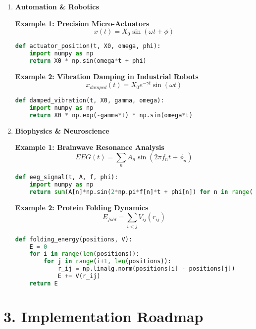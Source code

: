 \documentclass[12pt]{article}
\begin{document}
\begin{enumerate}[leftmargin=0pt, label=\textbf{\arabic*.}, itemsep=2em]
\item \textbf{Automation \& Robotics}

    \textbf{Example 1: Precision Micro-Actuators}
    \[
    x(t) = X_0 \sin(\omega t + \phi)
    \]
    \begin{lstlisting}[language=Python]
def actuator_position(t, X0, omega, phi):
    import numpy as np
    return X0 * np.sin(omega*t + phi)
    \end{lstlisting}

    \textbf{Example 2: Vibration Damping in Industrial Robots}
    \[
    x_{damped}(t) = X_0 e^{-\gamma t} \sin(\omega t)
    \]
    \begin{lstlisting}[language=Python]
def damped_vibration(t, X0, gamma, omega):
    import numpy as np
    return X0 * np.exp(-gamma*t) * np.sin(omega*t)
    \end{lstlisting}

\item \textbf{Biophysics \& Neuroscience}

    \textbf{Example 1: Brainwave Resonance Analysis}
    \[
    EEG(t) = \sum_{n} A_n \sin(2\pi f_n t + \phi_n)
    \]
    \begin{lstlisting}[language=Python]
def eeg_signal(t, A, f, phi):
    import numpy as np
    return sum(A[n]*np.sin(2*np.pi*f[n]*t + phi[n]) for n in range(len(A)))
    \end{lstlisting}

    \textbf{Example 2: Protein Folding Dynamics}
    \[
    E_{fold} = \sum_{i<j} V_{ij}(r_{ij})
    \]
    \begin{lstlisting}[language=Python]
def folding_energy(positions, V):
    E = 0
    for i in range(len(positions)):
        for j in range(i+1, len(positions)):
            r_ij = np.linalg.norm(positions[i] - positions[j])
            E += V(r_ij)
    return E
    \end{lstlisting}

\end{enumerate}


\section*{3. Implementation Roadmap}
\end{document}
